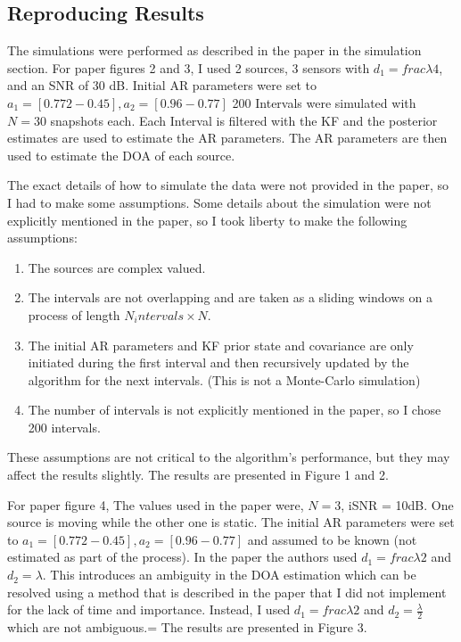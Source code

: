 \documentclass{article}
\begin{document}
\subsection{Reproducing Results}
The simulations were performed as described in the paper in the simulation section.
For paper figures 2 and 3, I used 2 sources, 3 sensors with $d_1 = frac{\lambda}{4}$, and an SNR of 30 dB.
Initial AR parameters were set to $a_1 = [0.772 -0.45] ,a_2 = [0.96 -0.77]$ 
200 Intervals were simulated with $N=30$ snapshots each. Each Interval is filtered with the KF and the posterior estimates are used to estimate the AR parameters.
The AR parameters are then used to estimate the DOA of each source.

The exact details of how to simulate the data were not provided in the paper, so I had to make some assumptions.
Some details about the simulation were not explicitly mentioned in the paper, so I took liberty to make the following assumptions:
\begin{enumerate}
    \item The sources are complex valued.
    \item The intervals are not overlapping and are taken as a sliding windows on a process of length $N_intervals \times N$.
    \item The initial AR parameters and KF prior state and covariance are only initiated during the first interval and then recursively updated by the algorithm for the next intervals. (This is not a Monte-Carlo simulation)
    \item The number of intervals is not explicitly mentioned in the paper, so I chose 200 intervals.
\end{enumerate}

These assumptions are not critical to the algorithm's performance, but they may affect the results slightly.
The results are presented in Figure 1 and 2.

For paper figure 4, The values used in the paper were, $N=3$, iSNR = 10dB. One source is moving while the other one is static.
The initial AR parameters were set to $a_1 = [0.772 -0.45] ,a_2 = [0.96 -0.77]$ and assumed to be known (not estimated as part of the process).
In the paper the authors used $d_1 = frac{\lambda}{2}$ and $d_2 =\lambda$.
This introduces an ambiguity in the DOA estimation which can be resolved using a method that is described in the paper that I did not implement for the lack of time and importance.
Instead, I used $d_1 = frac{\lambda}{2}$ and $d_2 =\frac{\lambda}{2}$ which are not ambiguous.=
The results are presented in Figure 3.
\end{document}
